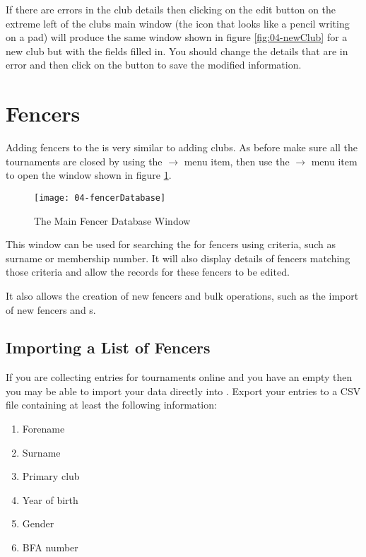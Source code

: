 \documentclass[a4paper,11pt]{memoir}
\begin{document}
If there are errors in the club details then clicking on the edit button on the extreme left of the clubs  main window (the icon that looks like a pencil writing on a pad) will produce the same window shown in figure \ref{fig:04-newClub} for a new club but with the fields filled in. You should change the details that are in error and then click on the  button to save the modified information.

\section{Fencers}\label{sec:fencers}
Adding fencers to the  is very similar to adding clubs. As before make sure all the tournaments are closed by using the  $\rightarrow$  menu item, then use the  $\rightarrow$  menu item to open the  window shown in figure \ref{fig:04-fencerDatabase}.

\begin{figure}
 \centering
 \texttt{[image: 04-fencerDatabase]}
 \caption{The Main Fencer Database Window} \label{fig:04-fencerDatabase}
\end{figure}

This window can be used for searching the  for fencers using criteria, such as surname or \gls{membership number}. It will also display details of fencers matching those criteria and allow the records for these fencers to be edited. 

It also allows the creation of new fencers and bulk operations, such as the import of new fencers and s.

\subsection{Importing a List of Fencers}

If you are collecting entries for tournaments online and you have an empty  then you may be able to import your data directly into \fencingtime{}.  Export your entries to a CSV file containing at least the following information:

\begin{enumerate}
 \item Forename
 \item Surname
 \item Primary club
 \item Year of birth
 \item Gender
 \item BFA number
\end{enumerate}
\end{document}
